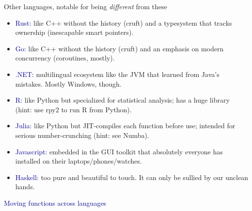 \documentclass{beamer}
\begin{document}
\begin{frame}{Other languages, notable for being {\it different} from these}
\vspace{0.35 cm}
\begin{itemize}\setlength{\itemsep}{0.18 cm}
\item<1-> \textcolor{darkblue}{Rust:} like C++ without the history (cruft) and a typesystem that tracks ownership (inescapable smart pointers).
\item<2-> \textcolor{darkblue}{Go:} like C++ without the history (cruft) and an emphasis on modern concurrency (coroutines, mostly).
\item<3-> \textcolor{darkblue}{.NET:} multilingual ecosystem like the JVM that learned from Java's mistakes. Mostly Windows, though.
\item<4-> \textcolor{darkblue}{R:} like Python but specialized for statistical analysis; has a huge library (hint: use rpy2 to run R from Python).
\item<5-> \textcolor{darkblue}{Julia:} like Python but JIT-compiles each function before use; intended for serious number-crunching (hint: see Numba).
\item<6-> \textcolor{darkblue}{Javascript:} embedded in the GUI toolkit that absolutely everyone has installed on their laptops/phones/watches.
\item<7-> \textcolor{darkblue}{Haskell:} too pure and beautiful to touch. It can only be sullied by our unclean hands.
\end{itemize}
\end{frame}

\begin{frame}{}
\begin{center}
\textcolor{darkblue}{\LARGE Moving functions across languages}
\end{center}
\end{frame}
\end{document}
